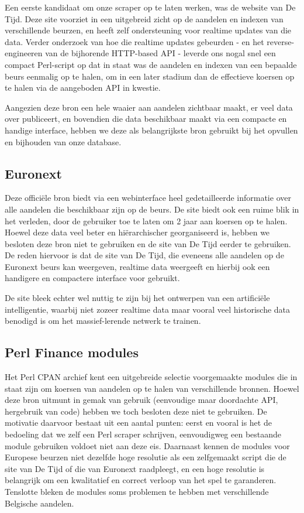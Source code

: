 Een eerste kandidaat om onze scraper op te laten werken, was de website van De Tijd. Deze site voorziet in een uitgebreid zicht op de aandelen en indexen van verschillende beurzen, en heeft zelf ondersteuning voor realtime updates van die data. Verder onderzoek van hoe die realtime updates gebeurden - en het reverse-engineeren van de bijhorende HTTP-based API - leverde ons nogal snel een compact Perl-script op dat in staat was de aandelen en indexen van een bepaalde beurs eenmalig op te halen, om in een later stadium dan de effectieve koersen op te halen via de aangeboden API in kwestie.

Aangezien deze bron een hele waaier aan aandelen zichtbaar maakt, er veel data over publiceert, en bovendien die data beschikbaar maakt via een compacte en handige interface, hebben we deze als belangrijkste bron gebruikt bij het opvullen en bijhouden van onze database.

\subsection{Euronext}

Deze offici\"ele bron biedt via een webinterface heel gedetailleerde informatie over alle aandelen die beschikbaar zijn op de beurs. De site biedt ook een ruime blik in het verleden, door de gebruiker toe te laten om 2 jaar aan koersen op te halen. Hoewel deze data veel beter en hi\"erarchischer georganiseerd is, hebben we besloten deze bron niet te gebruiken en de site van De Tijd eerder te gebruiken. De reden hiervoor is dat de site van De Tijd, die eveneens alle aandelen op de Euronext beurs kan weergeven, realtime data weergeeft en hierbij ook een handigere en compactere interface voor gebruikt.

De site bleek echter wel nuttig te zijn bij het ontwerpen van een artifici\"ele intelligentie, waarbij niet zozeer realtime data maar vooral veel historische data benodigd is om het massief-lerende netwerk te trainen.

\subsection{Perl Finance modules}

Het Perl CPAN archief kent een uitgebreide selectie voorgemaakte modules die in staat zijn om koersen van aandelen op te halen van verschillende bronnen. Hoewel deze bron uitmunt in gemak van gebruik (eenvoudige maar doordachte API, hergebruik van code) hebben we toch besloten deze niet te gebruiken. De motivatie daarvoor bestaat uit een aantal punten: eerst en vooral is het de bedoeling dat we zelf een Perl scraper schrijven, eenvoudigweg een bestaande module gebruiken voldoet niet aan deze eis. Daarnaast kennen de modules voor Europese beurzen niet dezelfde hoge resolutie als een zelfgemaakt script die de site van De Tijd of die van Euronext raadpleegt, en een hoge resolutie is belangrijk om een kwalitatief en correct verloop van het spel te garanderen. Tenslotte bleken de modules soms problemen te hebben met verschillende Belgische aandelen.


